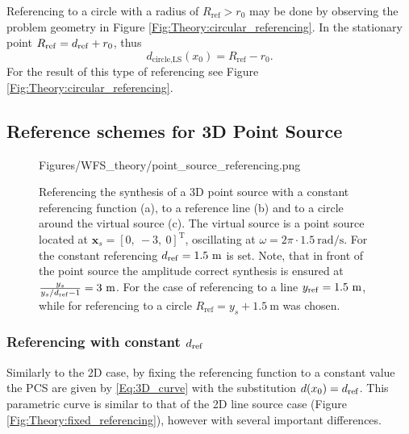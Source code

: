Referencing to a circle with a radius of $R_{\mathrm{ref}} > r_0$ may be done by observing the problem geometry in Figure \ref{Fig:Theory:circular_referencing}. 
In the stationary point $R_{\mathrm{ref}} = d_{\mathrm{ref}} + r_0$, thus
%
\begin{equation}
d_\text{circle,LS}(x_0) = R_{\mathrm{ref}} - r_0.
\label{Eq:dCircleLS}
\end{equation}
%
For the result of this type of referencing see Figure \ref{Fig:Theory:circular_referencing}.


\subsection{Reference schemes for 3D Point Source}

\begin{figure}[h!]
	\centering
	\begin{overpic}[width = .85\columnwidth ]{Figures/WFS_theory/point_source_referencing.png}
	\scriptsize
	\end{overpic}
\caption{Referencing the synthesis of a 3D point source with a constant referencing function (a), to a reference line (b) and to a circle around the virtual source (c). The virtual source is a point source located at $\mathbf{x}_s = [0,\ -3,\ 0]^\mathrm{T}$, oscillating at $\omega = 2\pi \cdot 1.5 ~\mathrm{rad/s}$. For the constant referencing $d_{\mathrm{ref}} = 1.5~\mathrm{m}$ is set. Note, that in front of the point source the amplitude correct synthesis is ensured at $\frac{y_s}{y_s/d_{\mathrm{ref}} - 1 } = 3~\mathrm{m}$. For the case of referencing to a line $y_{\mathrm{ref}} = 1.5~\mathrm{m}$, while for referencing to a circle $R_{\mathrm{ref}} = y_s + 1.5~\mathrm{m}$ was chosen.}
	\label{Fig:Theory:point_source_referencing}
\end{figure}

\subsubsection[Referencing with constant dref]{Referencing with constant $d_{\mathrm{ref}}$}

Similarly to the 2D case, by fixing the referencing function to a constant value the PCS are given by \eqref{Eq:3D_curve} with the substitution $d(x_0) = d_{\mathrm{ref}}$.
This parametric curve is similar to that of the 2D line source case (Figure \ref{Fig:Theory:fixed_referencing}), however with several important differences.

